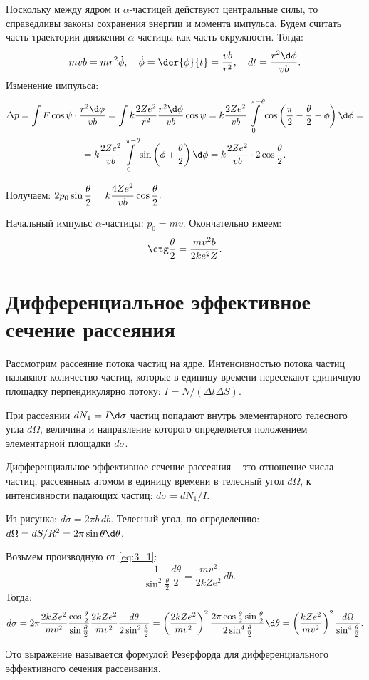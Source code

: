Поскольку между ядром и \( \alpha \)-частицей действуют центральные силы, то
справедливы законы сохранения энергии и момента импульса. Будем считать часть
траектории движения \( \alpha \)-частицы как часть окружности. Тогда:
\[
    m vb = m r^2\dot{\phi}, \quad \dot{\phi} = \der{\phi}{t} =
    \frac{vb}{r^2}, \quad dt = \frac{r^2\d\phi}{vb}.
\]
Изменение импульса:
\begin{gather*}
    \Delta p = \int F\cos\psi\cdot\frac{r^2\d\phi}{vb} = \int k\frac{2Ze^2}{r^2}
    \frac{r^2\d\phi}{vb}\cos\psi = k\frac{2Ze^2}{vb}\int\limits_0^{\pi - \theta}
    \cos\left( \frac{\pi}{2} - \frac{\theta}{2} - \phi \right)\d\phi = \\
    = k\frac{2Ze^2}{vb}\int\limits_0^{\pi - \theta} \sin\left( \phi +
    \frac{\theta}{2}\right)\d\phi = k\frac{2Ze^2}{vb}\cdot2\cos\frac{\theta}{2}.
\end{gather*}

Получаем: \( \displaystyle 2p_0\sin\frac{\theta}{2} = k\frac{4Ze^2}{vb}\cos\frac{\theta}
{2}. \)

Начальный импульс \( \alpha \)-частицы: \( p_0 = mv \). Окончательно имеем:
\begin{equation}
    \ctg\frac{\theta}{2} = \frac{mv^2b}{2ke^2Z}.
    \label{eq:3_1}
\end{equation}

\section{Дифференциальное эффективное сечение рассеяния}
Рассмотрим рассеяние потока частиц на ядре. Интенсивностью потока частиц
называют количество частиц, которые в единицу времени пересекают единичную
площадку перпендикулярно потоку: \( I = N/(\Delta t\Delta S) \).
 
При рассеянии \( dN_1 = I\d\sigma \) частиц попадают внутрь элементарного
телесного угла \( d\Omega \), величина и направление которого определяется
положением элементарной площадки \( d\sigma \).

Дифференциальное эффективное сечение рассеяния -- это отношение числа частиц,
рассеянных атомом в единицу времени в телесный угол \( d\Omega \), к
интенсивности падающих частиц: \( d\sigma = dN_1/I \).

Из рисунка: \( d\sigma = 2\pi b\,db \). Телесный угол, по определению:
\( d\Omega = dS/R^2 = 2\pi\sin\theta\d\theta \).

Возьмем производную от \eqref{eq:3_1}:
\[
    -\frac{1}{\sin^2\frac{\theta}{2}}\frac{d\theta}{2} = \frac{mv^2}{2kZe^2}\,db.
\]
Тогда:
\[
    d\sigma = 2\pi\frac{2kZe^2}{mv^2}\frac{\cos\frac{\theta}{2}}{\sin\frac
    {\theta}{2}}\frac{2kZe^2}{mv^2}\frac{d\theta}{2\sin^2\frac{\theta}{2}} =
    \left( \frac{2kZe^2}{mv^2} \right)^2 \frac{2\pi\cos\frac{\theta}{2}\sin
    \frac{\theta}{2}}{2\sin^4\frac{\theta}{2}}\d\theta = \left( \frac{kZe^2}
    {mv^2} \right)^2 \frac{d\Omega}{\sin^4\frac{\theta}{2}}.
\]

Это выражение называется формулой Резерфорда для дифференциального эффективного
сечения рассеивания.

\newpage
